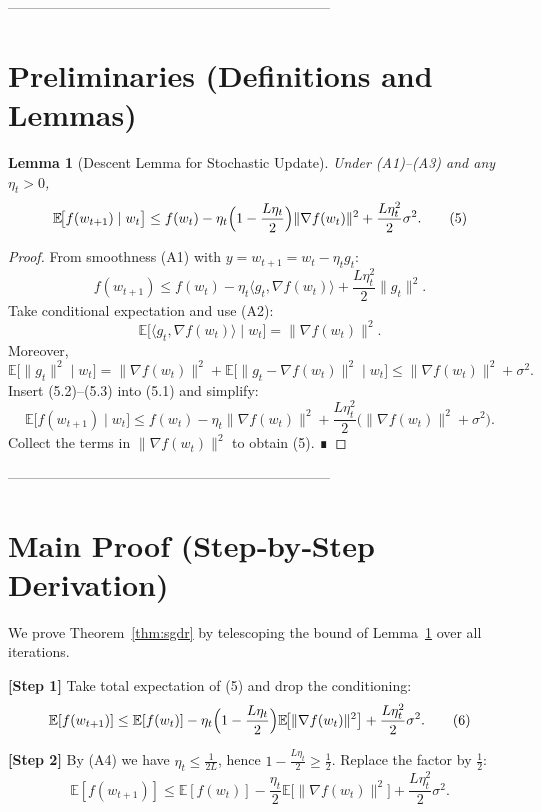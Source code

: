 \documentclass{article}
\newtheorem{lemma}{Lemma}
\newcommand{\E}{\mathbb{E}}
\begin{document}
---------------------------------------------------------------------

\section*{Preliminaries (Definitions and Lemmas)}
\begin{lemma}[Descent Lemma for Stochastic Update]
\label{lem:descent}
Under (A1)–(A3) and any $\eta_t>0$,
\[
\E\!\bigl[f(w_{t+1})\mid w_t\bigr]
\le f(w_t)-\eta_t\Bigl(1-\frac{L\eta_t}{2}\Bigr)\|\nabla f(w_t)\|^{2}
+ \frac{L\eta_t^{2}}{2}\sigma^{2}.
\tag{5}
\]
\end{lemma}
\begin{proof}
From smoothness (A1) with $y=w_{t+1}=w_t-\eta_t g_t$:
\[
f(w_{t+1})\le f(w_t)-\eta_t\langle g_t,\nabla f(w_t)\rangle
+\frac{L\eta_t^{2}}{2}\|g_t\|^{2}. \tag{5.1}
\]
Take conditional expectation and use (A2):
\[
\E\!\bigl[\langle g_t,\nabla f(w_t)\rangle\mid w_t\bigr]
= \|\nabla f(w_t)\|^{2}. \tag{5.2}
\]
Moreover,
\[
\E\!\bigl[\|g_t\|^{2}\mid w_t\bigr]
=\|\nabla f(w_t)\|^{2}+\E\!\bigl[\|g_t-\nabla f(w_t)\|^{2}\mid w_t\bigr]
\le \|\nabla f(w_t)\|^{2}+\sigma^{2}. \tag{5.3}
\]
Insert (5.2)–(5.3) into (5.1) and simplify:
\[
\E\!\bigl[f(w_{t+1})\mid w_t\bigr]
\le f(w_t)-\eta_t\|\nabla f(w_t)\|^{2}
+\frac{L\eta_t^{2}}{2}\bigl(\|\nabla f(w_t)\|^{2}+\sigma^{2}\bigr).
\]
Collect the terms in $\|\nabla f(w_t)\|^{2}$ to obtain (5). ∎
\end{proof}

---------------------------------------------------------------------

\section*{Main Proof (Step‑by‑Step Derivation)}
We prove Theorem~\ref{thm:sgdr} by telescoping the bound of Lemma~\ref{lem:descent}
over all iterations.

\noindent\textbf{[Step 1]}  Take total expectation of (5) and drop the conditioning:
\[
\E[f(w_{t+1})]\le \E[f(w_t)]-
\eta_t\Bigl(1-\frac{L\eta_t}{2}\Bigr)\E\!\bigl[\|\nabla f(w_t)\|^{2}\bigr]
+\frac{L\eta_t^{2}}{2}\sigma^{2}. \tag{6}
\]

\noindent\textbf{[Step 2]}  By (A4) we have $\eta_t\le\frac{1}{2L}$, hence
$1-\frac{L\eta_t}{2}\ge\frac{1}{2}$.  Replace the factor by $\frac12$:
\[
\E[f(w_{t+1})]\le \E[f(w_t)]-
\frac{\eta_t}{2}\E\!\bigl[\|\nabla f(w_t)\|^{2}\bigr]
+\frac{L\eta_t^{2}}{2}\sigma^{2}. \tag{7}
\]
\end{document}
